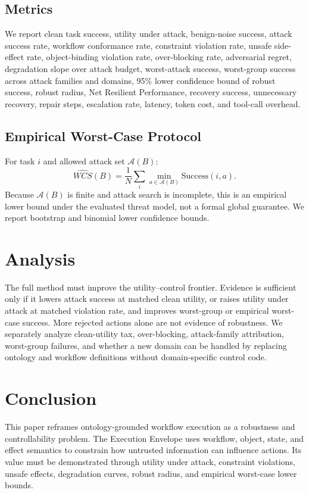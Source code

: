 \documentclass[10pt,twocolumn]{article}
\begin{document}
\subsection{Metrics}
We report clean task success, utility under attack, benign-noise success, attack success rate, workflow conformance rate, constraint violation rate, unsafe side-effect rate, object-binding violation rate, over-blocking rate, adversarial regret, degradation slope over attack budget, worst-attack success, worst-group success across attack families and domains, 95\% lower confidence bound of robust success, robust radius, Net Resilient Performance, recovery success, unnecessary recovery, repair steps, escalation rate, latency, token cost, and tool-call overhead.

\subsection{Empirical Worst-Case Protocol}
For task $i$ and allowed attack set $\mathcal{A}(B)$:
\[
\widehat{WCS}(B)=\frac{1}{N}\sum_i \min_{a\in\mathcal{A}(B)}\mathrm{Success}(i,a).
\]
Because $\mathcal{A}(B)$ is finite and attack search is incomplete, this is an empirical lower bound under the evaluated threat model, not a formal global guarantee. We report bootstrap and binomial lower confidence bounds.

\section{Analysis}
The full method must improve the utility--control frontier. Evidence is sufficient only if it lowers attack success at matched clean utility, or raises utility under attack at matched violation rate, and improves worst-group or empirical worst-case success. More rejected actions alone are not evidence of robustness. We separately analyze clean-utility tax, over-blocking, attack-family attribution, worst-group failures, and whether a new domain can be handled by replacing ontology and workflow definitions without domain-specific control code.

\section{Conclusion}
This paper reframes ontology-grounded workflow execution as a robustness and controllability problem. The Execution Envelope uses workflow, object, state, and effect semantics to constrain how untrusted information can influence actions. Its value must be demonstrated through utility under attack, constraint violations, unsafe effects, degradation curves, robust radius, and empirical worst-case lower bounds.
\end{document}
